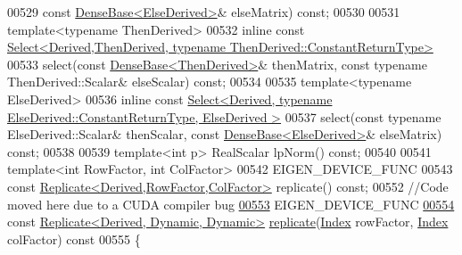 \begin{DoxyCode}
00529            \textcolor{keyword}{const} \hyperlink{group___core___module_class_eigen_1_1_dense_base}{DenseBase<ElseDerived>}& elseMatrix) \textcolor{keyword}{const};
00530 
00531     \textcolor{keyword}{template}<\textcolor{keyword}{typename} ThenDerived>
00532     \textcolor{keyword}{inline} \textcolor{keyword}{const} 
      \hyperlink{group___core___module_class_eigen_1_1_select}{Select<Derived,ThenDerived, typename ThenDerived::ConstantReturnType>}
00533     select(\textcolor{keyword}{const} \hyperlink{group___core___module_class_eigen_1_1_dense_base}{DenseBase<ThenDerived>}& thenMatrix, \textcolor{keyword}{const} \textcolor{keyword}{typename} 
      ThenDerived::Scalar& elseScalar) \textcolor{keyword}{const};
00534 
00535     \textcolor{keyword}{template}<\textcolor{keyword}{typename} ElseDerived>
00536     \textcolor{keyword}{inline} \textcolor{keyword}{const} 
      \hyperlink{group___core___module_class_eigen_1_1_select}{Select<Derived, typename ElseDerived::ConstantReturnType, ElseDerived >}
00537     select(\textcolor{keyword}{const} \textcolor{keyword}{typename} ElseDerived::Scalar& thenScalar, \textcolor{keyword}{const} 
      \hyperlink{group___core___module_class_eigen_1_1_dense_base}{DenseBase<ElseDerived>}& elseMatrix) \textcolor{keyword}{const};
00538 
00539     \textcolor{keyword}{template}<\textcolor{keywordtype}{int} p> RealScalar lpNorm() \textcolor{keyword}{const};
00540 
00541     \textcolor{keyword}{template}<\textcolor{keywordtype}{int} RowFactor, \textcolor{keywordtype}{int} ColFactor>
00542     EIGEN\_DEVICE\_FUNC
00543     \textcolor{keyword}{const} \hyperlink{group___core___module_class_eigen_1_1_replicate}{Replicate<Derived,RowFactor,ColFactor>} replicate() \textcolor{keyword}{const};
00552     \textcolor{comment}{//Code moved here due to a CUDA compiler bug}
\hyperlink{group___core___module_a21b239da40faaef9658b4632d7dd77a7}{00553}     EIGEN\_DEVICE\_FUNC
\hyperlink{group___core___module_a4475dc25a383c84656f5c55b890ecacf}{00554}     \textcolor{keyword}{const} \hyperlink{group___core___module_class_eigen_1_1_replicate}{Replicate<Derived, Dynamic, Dynamic>} 
      \hyperlink{group___core___module_a4475dc25a383c84656f5c55b890ecacf}{replicate}(\hyperlink{namespace_eigen_a62e77e0933482dafde8fe197d9a2cfde}{Index} rowFactor, \hyperlink{namespace_eigen_a62e77e0933482dafde8fe197d9a2cfde}{Index} colFactor)\textcolor{keyword}{ const}
00555 \textcolor{keyword}{    }\{

\end{DoxyCode}
